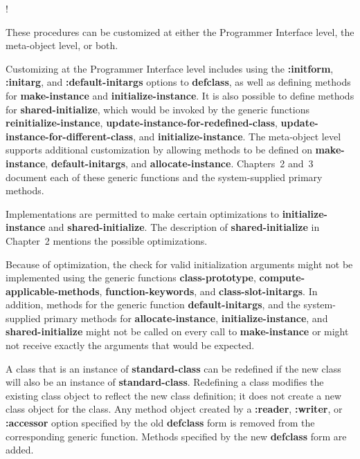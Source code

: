 \endscreen!

These procedures can be customized at either the Programmer Interface level,
the meta-object level, or both.  

Customizing at the Programmer Interface level includes using the {\bf
:initform}, {\bf :initarg}, and {\bf :default-initargs} options to
{\bf defclass}, as well as defining methods for {\bf make-instance}
and {\bf initialize-instance}.  It is also possible to define
methods for {\bf shared-initialize}, which would be invoked by the
generic functions {\bf reinitialize-instance}, {\bf
update-instance-for-redefined-class}, {\bf
update-instance-for-different-class}, and {\bf
initialize-instance}.  The meta-object level supports additional
customization by allowing methods to be defined on {\bf
make-instance}, {\bf default-initargs}, and {\bf
allocate-instance}.  Chapters~2 and~3 document each of these generic
functions and the system-supplied primary methods.

Implementations are permitted to make certain optimizations to {\bf
initialize-instance} and {\bf shared-initialize}.  The
description of {\bf shared-initialize} in Chapter~2 mentions the
possible optimizations.

Because of optimization, the check for valid initialization arguments
might not be implemented using the generic functions {\bf
class-prototype}, {\bf compute-applicable-methods}, {\bf
function-keywords}, and {\bf class-slot-initargs}. In addition,
methods for the generic function {\bf default-initargs}, and the
system-supplied primary methods for {\bf allocate-instance}, {\bf
initialize-instance}, and {\bf shared-initialize} might not be called on
every call to {\bf make-instance} or might not receive exactly the
arguments that would be expected.

\endsubSection%

\endSection%


A class that is an instance of {\bf standard-class} can be redefined
if the new class will also be an instance of {\bf standard-class}.
Redefining a class modifies the existing class object to reflect the
new class definition; it does not create a new class object for the
class.  Any method object created by a {\bf :reader}, {\bf :writer}, or
{\bf :accessor} option specified by the old {\bf defclass} form is
removed from the corresponding generic function.
Methods specified by the new {\bf defclass} form are added.

